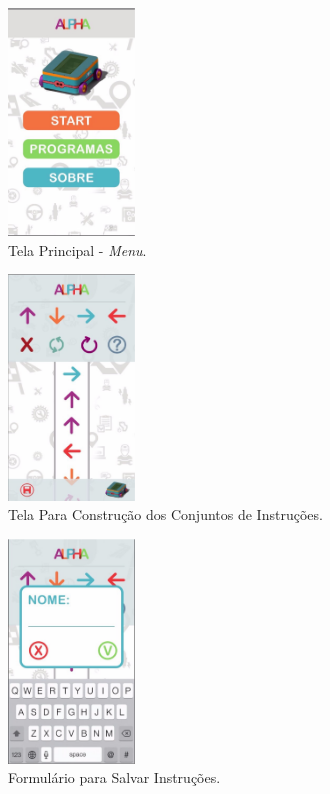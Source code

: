 \begin{figure}[H]
    \centering
    \includegraphics[width=0.3\textwidth]{figuras/main_menu.eps}
    \caption{Tela Principal - \textit{Menu}.}
    \label{fig:main_menu}
\end{figure}

\begin{figure}[H]
    \centering
    \includegraphics[width=0.3\textwidth]{figuras/instruction.eps}
    \caption{Tela Para Construção dos Conjuntos de Instruções.}
    \label{fig:instruction}
\end{figure}

\begin{figure}[H]
    \centering
    \includegraphics[width=0.3\textwidth]{figuras/save_form.eps}
    \caption{Formulário para Salvar Instruções.}
    \label{fig:save_form}
\end{figure}

